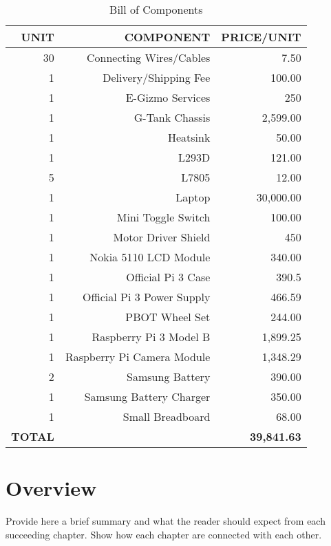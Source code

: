 \begin{table}[htbp]
  \centering
  \caption{Bill of Components}
    \begin{tabular}{rrr}
    \toprule
    \textbf{UNIT} & \textbf{COMPONENT} & \textbf{PRICE/UNIT} \\
    \midrule
    
    30    & Connecting Wires/Cables & 7.50 \\
    1     & Delivery/Shipping Fee & 100.00 \\
    1     & E-Gizmo Services & 250 \\
    1     & G-Tank Chassis & 2,599.00 \\
    1     & Heatsink & 50.00 \\
    1     & L293D & 121.00 \\
    5     & L7805 & 12.00 \\
    1     & Laptop & 30,000.00 \\
    1     & Mini Toggle Switch & 100.00 \\
    1     & Motor Driver Shield & 450 \\
    1     & Nokia 5110 LCD Module & 340.00 \\
    1     & Official Pi 3 Case & 390.5 \\
    1     & Official Pi 3 Power Supply & 466.59 \\
    1     & PBOT Wheel Set & 244.00 \\
    1     & Raspberry Pi 3 Model B & 1,899.25 \\
    1     & Raspberry Pi Camera Module & 1,348.29 \\
    2     & Samsung Battery & 390.00 \\
    1     & Samsung Battery Charger & 350.00 \\
    1     & Small Breadboard & 68.00 \\

		\midrule
    \textbf{TOTAL} & \textbf{} & \textbf{~39,841.63 } \\
    \bottomrule
    \end{tabular}%
  \label{tab:addlabel}%
\end{table}%



\section{Overview}

Provide here a brief summary and what the reader should expect from each succeeding chapter.  Show how each chapter are connected with each other.

